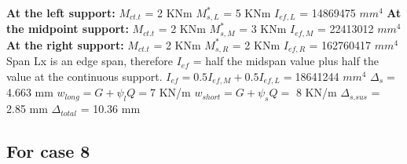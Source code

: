 \documentclass{article}%
\begin{document}
%
\newline%
\newline%
%
\textbf{At the left support:}%
\newline%
\newline%
%
$M_{ct.t}$ = 2 KNm%
\newline%
%
$M_{s,L}^{*}$ = 5 KNm%
\newline%
%
$I_{ef,L}$ = 14869475 $mm^{4}$%
\newline%
\newline%
%
\textbf{At the midpoint support:}%
\newline%
\newline%
%
$M_{ct.t}$ = 2 KNm%
\newline%
%
$M_{s,M}^{*}$ = 3 KNm%
\newline%
%
$I_{ef,M}$ = 22413012 $mm^{4}$%
\newline%
\newline%
%
\textbf{At the right support:}%
\newline%
\newline%
%
$M_{ct.t}$ = 2 KNm%
\newline%
%
$M_{s,R}^{*}$ = 2 KNm%
\newline%
%
$I_{ef,R}$ = 162760417 $mm^{4}$%
\newline%
\newline%
%
Span Lx is an edge span, therefore $I_{ef}$ = half the midspan value plus half the value at the continuous support.%
\newline%
\newline%
%
$I_{ef} = 0.5I_{ef,M} + 0.5I_{ef,L} = $18641244 $ mm^{4}$%
\newline%
\newline%
%
$\Delta_{s} =$4.663 mm%
\newline%
\newline%
%
$w_{long} = G + \psi_{l}Q = $7 KN/m%
\newline%
%
$w_{short} = G + \psi_{s}Q = $ 8 KN/m%
\newline%
\newline%
%
$\Delta_{s.sus}$ = 2.85 mm%
\newline%
\newline%
%
$\Delta_{total}$ = 10.36 mm%
\subsection*{For case 8}%
\label{subsec:Forcase8}%
\end{document}
